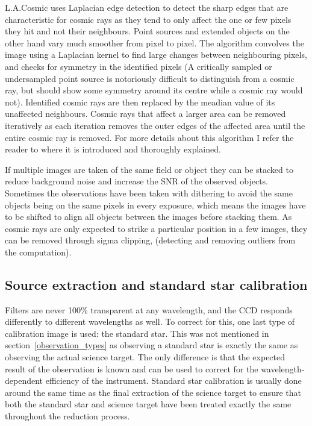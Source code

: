 \documentclass[a4paper,oneside,12pt, class=Latex/Classes/PhDthesisPSnPDF, crop=false]{standalone}
\begin{document}
L.A.Cosmic uses Laplacian edge detection to detect the sharp edges that are characteristic for cosmic rays as they tend to only affect the one or few pixels they hit and not their neighbours. Point sources and extended objects on the other hand vary much smoother from pixel to pixel. The algorithm convolves the image using a Laplacian kernel to find large changes between neighbouring pixels, and checks for symmetry in the identified pixels (A critically sampled or undersampled point source is notoriously difficult to distinguish from a cosmic ray, but should show some symmetry around its centre while a cosmic ray would not). Identified cosmic rays are then replaced by the meadian value of its unaffected neighbours. Cosmic rays that affect a larger area can be removed iteratively as each iteration removes the outer edges of the affected area until the entire cosmic ray is removed. For more details about this algorithm I refer the reader to \citet{lacosmic} where it is introduced and thoroughly explained.

If multiple images are taken of the same field or object they can be stacked to reduce background noise and increase the SNR of the observed objects. Sometimes the observations have been taken with dithering to avoid the same objects being on the same pixels in every exposure, which means the images have to be shifted to align all objects between the images before stacking them. As cosmic rays are only expected to strike a particular position in a few images, they can be removed through sigma clipping, (detecting and removing outliers from the computation).


\subsection{Source extraction and standard star calibration}
Filters are never 100\% transparent at any wavelength, and the CCD responds differently to different wavelengths as well. To correct for this, one last type of calibration image is used: the standard star. This was not mentioned in section~\ref{observation_types} as observing a standard star is exactly the same as observing the actual science target. The only difference is that the expected result of the observation is known and can be used to correct for the wavelength-dependent efficiency of the instrument. Standard star calibration is usually done around the same time as the final extraction of the science target to ensure that both the standard star and science target have been treated exactly the same throughout the reduction process.
\end{document}
